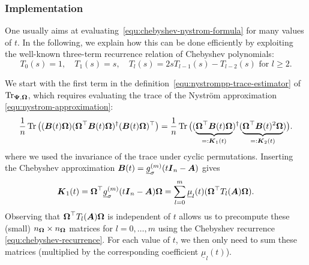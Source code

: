 \subsubsection{Implementation}
\label{subsubsec:chebyshev-nystrom-implementation}

One usually aims at evaluating~\cref{equ:chebyshev-nystrom-formula} for many values of $t$. In the following, we explain how this can be done efficiently by exploiting 
the well-known three-term recurrence relation of Chebyshev polynomials:
\begin{equation}
    T_0(s) = 1,\quad  T_1(s) = s,\quad 
    T_l(s) = 2 s T_{l-1}(s) - T_{l-2}(s) \text{ for $l \geq 2$.}
    \label{equ:chebyshev-recurrence}
\end{equation}

We start with the first term in the definition~\cref{equ:nystrompp-trace-estimator} of $\operatorname{Tr}_{\boldsymbol{\Psi}, \boldsymbol{\Omega}}$, which requires evaluating the trace of the 
Nyström approximation \cref{equ:nystrom-approximation}:
\begin{equation}
    \frac{1}{n} \operatorname{Tr} \big((\boldsymbol{B}(t) \boldsymbol{\Omega}) (\boldsymbol{\Omega}^{\top} \boldsymbol{B}(t) \boldsymbol{\Omega})^{\dagger} (\boldsymbol{B}(t) \boldsymbol{\Omega})^{\top} \big) =
    \frac{1}{n} \operatorname{Tr} \big((\underbrace{\boldsymbol{\Omega}^{\top} \boldsymbol{B}(t) \boldsymbol{\Omega}}_{=: \boldsymbol{K}_1(t)})^{\dagger} (\underbrace{\boldsymbol{\Omega}^{\top} \boldsymbol{B}(t)^2 \boldsymbol{\Omega}}_{=: \boldsymbol{K}_2(t)}) \big).
    \label{equ:cyclic-property}
\end{equation}
where we used the invariance of the trace under cyclic permutations.
Inserting the Chebyshev approximation  $\boldsymbol{B}(t) = \underline{g}_{\sigma}^{(m)}(t \boldsymbol{I}_n - \boldsymbol{A})$ gives
\begin{equation*}
    \boldsymbol{K}_1(t) = \boldsymbol{\Omega}^{\top} \underline{g}_{\sigma}^{(m)}(t \boldsymbol{I}_n - \boldsymbol{A}) \boldsymbol{\Omega} = \sum_{l=0}^{m} \underline{\mu}_l(t) (\boldsymbol{\Omega}^{\top} T_l(\boldsymbol{A}) \boldsymbol{\Omega}).
\end{equation*}
Observing that $\boldsymbol{\Omega}^{\top} T_l(\boldsymbol{A}) \boldsymbol{\Omega}$ is independent of $t$ allows us to precompute these (small) $n_{\boldsymbol{\Omega}} \times n_{\boldsymbol{\Omega}}$ matrices for $l=0, \dots, m$ using the Chebyshev recurrence \cref{equ:chebyshev-recurrence}. For each value of $t$, we then only need to sum these matrices (multiplied by the corresponding coefficient $\underline{\mu}_l(t)$).

